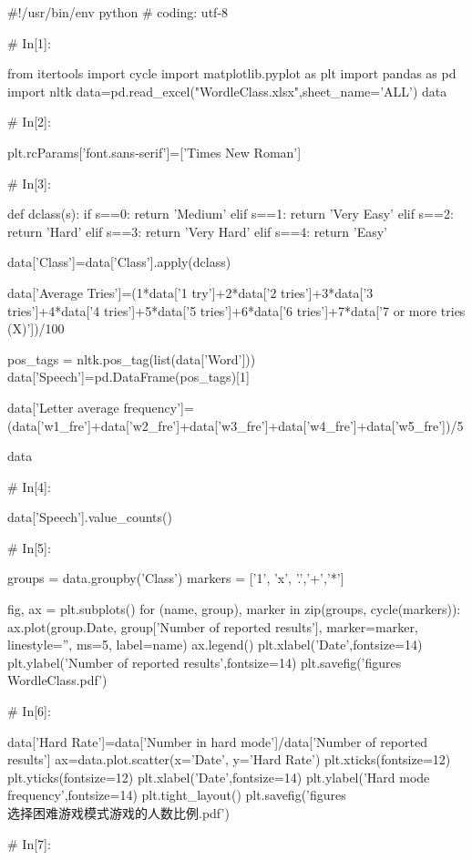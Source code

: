 \documentclass{MathModeling}
\begin{document}
\begin{python}
#!/usr/bin/env python
# coding: utf-8

# In[1]:


from itertools import cycle
import matplotlib.pyplot as plt
import pandas as pd
import nltk
data=pd.read_excel("WordleClass.xlsx",sheet_name='ALL')
data


# In[2]:


plt.rcParams['font.sans-serif']=['Times New Roman']


# In[3]:


def dclass(s):
    if s==0:
        return 'Medium'
    elif s==1:
        return 'Very Easy'
    elif s==2:
        return 'Hard'
    elif s==3:
        return 'Very Hard'
    elif s==4:
        return 'Easy'


data['Class']=data['Class'].apply(dclass)

data['Average Tries']=(1*data['1 try']+2*data['2 tries']+3*data['3 tries']+4*data['4 tries']+5*data['5 tries']+6*data['6 tries']+7*data['7 or more tries (X)'])/100

pos_tags = nltk.pos_tag(list(data['Word']))
data['Speech']=pd.DataFrame(pos_tags)[1]

data['Letter average frequency']=(data['w1_fre']+data['w2_fre']+data['w3_fre']+data['w4_fre']+data['w5_fre'])/5

data


# In[4]:


data['Speech'].value_counts()


# In[5]:


groups = data.groupby('Class')
markers = ['1', 'x', '.','+','*']

fig, ax = plt.subplots()
for (name, group), marker in zip(groups, cycle(markers)):
    ax.plot(group.Date, group['Number of reported results'], marker=marker, linestyle='', ms=5, label=name)
ax.legend()
plt.xlabel('Date',fontsize=14)
plt.ylabel('Number of reported results',fontsize=14)
plt.savefig('figures\\WordleClass.pdf')


# In[6]:


data['Hard Rate']=data['Number in hard mode']/data['Number of reported results']
ax=data.plot.scatter(x='Date', y='Hard Rate')
plt.xticks(fontsize=12)
plt.yticks(fontsize=12)
plt.xlabel('Date',fontsize=14)
plt.ylabel('Hard mode frequency',fontsize=14)
plt.tight_layout()
plt.savefig('figures\\选择困难游戏模式游戏的人数比例.pdf')


# In[7]:



\end{python}
\end{document}
